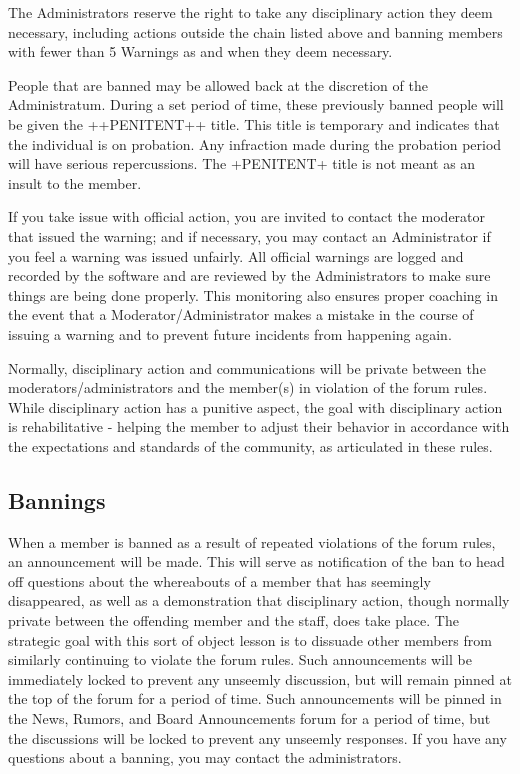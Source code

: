 \documentclass[12pt]{article}
\begin{document}
The Administrators reserve the right to take any disciplinary action 
they deem necessary, including actions outside the chain listed above 
and banning members with fewer than 5 Warnings as and when they deem 
necessary.

People that are banned may be allowed back at the discretion of the 
Administratum. During a set period of time, these previously banned 
people will be given the ++PENITENT++ title. This title is temporary 
and indicates that the individual is on probation. Any infraction made 
during the probation period will have serious repercussions. The 
+PENITENT+ title is not meant as an insult to the member.

If you take issue with official action, you are invited to contact the 
moderator that issued the warning; and if necessary, you may contact an 
Administrator if you feel a warning was issued unfairly. All official 
warnings are logged and recorded by the software and are reviewed by 
the Administrators to make sure things are being done properly. This 
monitoring also ensures proper coaching in the event that a 
Moderator/Administrator makes a mistake in the course of issuing a 
warning and to prevent future incidents from happening again.

Normally, disciplinary action and communications will be private 
between the moderators/administrators and the member(s) in violation of 
the forum rules. While disciplinary action has a punitive aspect, the 
goal with disciplinary action is rehabilitative - helping the member to 
adjust their behavior in accordance with the expectations and standards 
of the community, as articulated in these rules.

\subsection{Bannings}

When a member is banned as a result of repeated violations of the forum 
rules, an announcement will be made. This will serve as notification of 
the ban to head off questions about the whereabouts of a member that 
has seemingly disappeared, as well as a demonstration that disciplinary 
action, though normally private between the offending member and the 
staff, does take place. The strategic goal with this sort of object 
lesson is to dissuade other members from similarly continuing to 
violate the forum rules. Such announcements will be immediately locked 
to prevent any unseemly discussion, but will remain pinned at the top 
of the forum for a period of time. Such announcements will be pinned in 
the News, Rumors, and Board Announcements forum for a period of time, 
but the discussions will be locked to prevent any unseemly responses. 
If you have any questions about a banning, you may contact the 
administrators.
\end{document}
